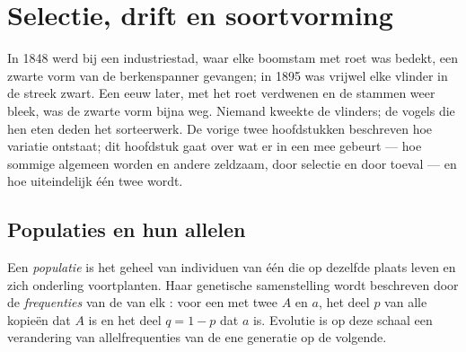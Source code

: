 \chapter{Selectie, drift en soortvorming}\label{ch:g12:selection-drift-speciation}

In 1848 werd bij een industriestad, waar elke boomstam met roet was
bedekt, een zwarte vorm van de berkenspanner gevangen; in 1895 was
vrijwel elke vlinder in de streek zwart. Een eeuw later, met het roet
verdwenen en de stammen weer bleek, was de zwarte vorm bijna weg. Niemand
kweekte de vlinders; de vogels die hen eten deden het sorteerwerk. De
vorige twee hoofdstukken beschreven hoe variatie ontstaat; dit hoofdstuk
gaat over wat er in een  mee gebeurt --- hoe sommige 
algemeen worden en andere zeldzaam, door selectie en door toeval --- en
hoe uiteindelijk één  twee  wordt.

\section{Populaties en hun allelen}

\begin{definition}\label{def:g12:selection-drift-speciation:population}
Een \emph{populatie} is het geheel van individuen van
één  die op dezelfde plaats leven en zich onderling voortplanten.
Haar genetische samenstelling wordt beschreven door de
\emph{frequenties} van de  van elk :
voor een  met twee  $A$ en $a$, het deel $p$ van alle kopieën
dat $A$ is en het deel $q = 1 - p$ dat $a$ is. Evolutie is op deze schaal
een verandering van allelfrequenties van de ene generatie op de volgende.
\end{definition}

